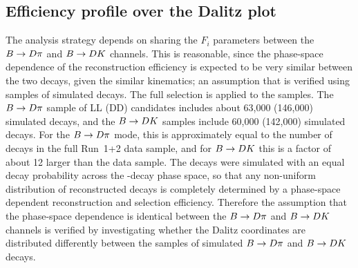 


\subsection{Efficiency profile over the Dalitz plot} %
\label{sub:efficiency_profile_over_the_dalitz_plot}



The analysis strategy depends on sharing the $F_i$ parameters between the ${B}\rightarrow{\ensuremath{D}}\pi$ and ${B}\rightarrow{\ensuremath{D}}{\ensuremath{K}}$ channels. This is reasonable, since the phase-space dependence of the reconstruction efficiency is expected to be very similar between the two decays, given the similar kinematics; an assumption that is verified using samples of simulated decays. The full selection is applied to the samples. The ${B}\rightarrow{\ensuremath{D}}\pi$ sample of LL (DD) candidates includes about 63,000 (146,000) simulated decays, and the ${B}\rightarrow{\ensuremath{D}}{\ensuremath{K}}$ samples include 60,000 (142,000) simulated decays. For the ${B}\rightarrow{\ensuremath{D}}\pi$ mode, this is approximately equal to the number of decays in the full Run~1+2 data sample, and for ${B}\rightarrow{\ensuremath{D}}{\ensuremath{K}}$ this is a factor of about 12 larger than the data sample. The decays were simulated with an equal decay probability across the \D-decay phase space, so that any non-uniform distribution of reconstructed decays is completely determined by a phase-space dependent reconstruction and selection efficiency. Therefore the assumption that the phase-space dependence is identical between the ${B}\rightarrow{\ensuremath{D}}\pi$ and ${B}\rightarrow{\ensuremath{D}}{\ensuremath{K}}$ channels is verified by investigating whether the Dalitz coordinates are distributed differently between the samples of simulated ${B}\rightarrow{\ensuremath{D}}\pi$ and ${B}\rightarrow{\ensuremath{D}}{\ensuremath{K}}$ decays.

